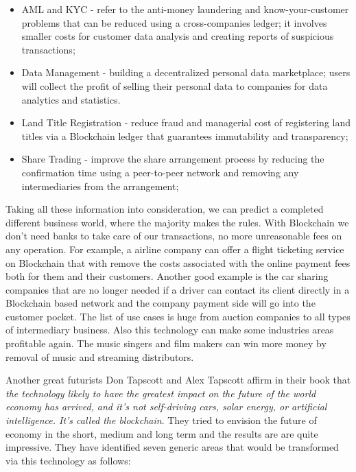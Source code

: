 \begin{itemize}
	\item AML and KYC - refer to the anti-money laundering and know-your-customer problems that can be reduced using a cross-companies ledger; it involves smaller costs for customer data analysis and creating reports of suspicious transactions;
	\item Data Management - building a decentralized personal data marketplace; users will collect the profit of selling their personal data to companies for data analytics and statistics.
	\item Land Title Registration - reduce fraud and managerial cost of registering land titles via a Blockchain ledger that guarantees immutability and transparency;
	\item Share Trading - improve the share arrangement process by reducing the confirmation time using a peer-to-peer network and removing any intermediaries from the arrangement;
\end{itemize}

Taking all these information into consideration, we can predict a completed different business world, where the majority makes the rules. With Blockchain we don't need banks to take care of our transactions, no more unreasonable fees on any operation. For example, a airline company can offer a flight ticketing service on Blockchain that with remove the costs associated with the online payment fees both for them and their customers. Another good example is the car sharing companies that are no longer needed if a driver can contact its client directly in a Blockchain based network and the company payment side will go into the customer pocket. The list of use cases is huge from auction companies to all types of intermediary business. Also this technology can make some industries areas profitable again. The music singers and film makers can win more money by removal of music and streaming distributors.

Another great futurists Don Tapscott and Alex Tapscott \cite{tapscott} affirm in their book that \emph{the technology likely to have the greatest impact on the future of the world economy has arrived, and it’s not self-driving cars, solar energy, or artificial intelligence. It’s called the blockchain}. They tried to envision the future of economy in the short, medium and long term and the results are are quite impressive. They have identified seven generic areas that would be transformed via this technology as follows:

